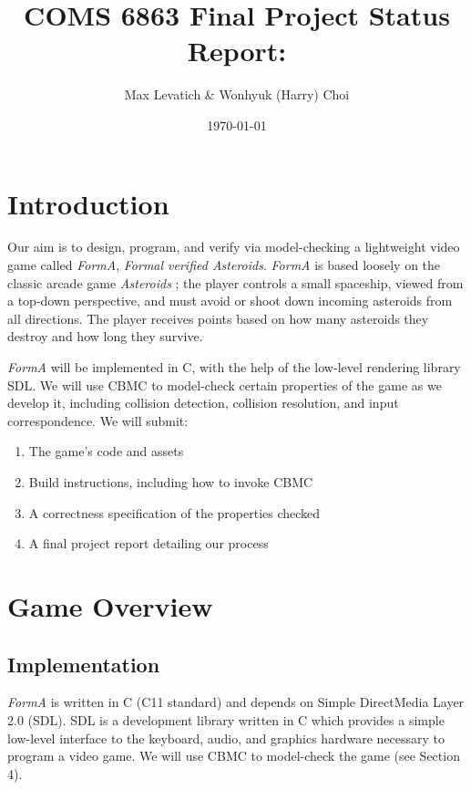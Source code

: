 \documentclass{article}
\title{COMS 6863 Final Project Status Report: \Name{}}
\author{Max Levatich \& Wonhyuk (Harry) Choi}
\date{\today}
\newcommand{\Name}{\textit{FormA}\xspace}
\begin{document}
\maketitle

\section{Introduction}

    Our aim is to design, program, and verify via model-checking a lightweight
	video game called \Name, \emph{Formal verified Asteroids}.
	\Name is based loosely on the classic arcade
    game \textit{Asteroids} \cite{asteroids}; the player controls a small
    spaceship, viewed from a top-down perspective, and must avoid or shoot down
    incoming asteroids from all directions. The player receives points based on
    how many asteroids they destroy and how long they survive.

    \Name{} will be implemented in C, with the help of the low-level rendering
    library SDL. We will use CBMC \cite{clarke2004tool} to model-check
    certain properties of the game as we develop it, including collision
    detection, collision resolution, and input correspondence. We will submit:

    \begin{enumerate}
        \item{The game's code and assets}
        \item{Build instructions, including how to invoke CBMC}
        \item{A correctness specification of the properties checked}
        \item{A final project report detailing our process}
    \end{enumerate}

\section{Game Overview}

    \subsection{Implementation}

        \Name{} is written in C (C11 standard) and depends on Simple DirectMedia
        Layer 2.0 (SDL). SDL is a development library written in C which
        provides a simple low-level interface to the keyboard, audio, and
        graphics hardware necessary to program a video game. We will use CBMC
        to model-check the game (see Section 4).
\end{document}
